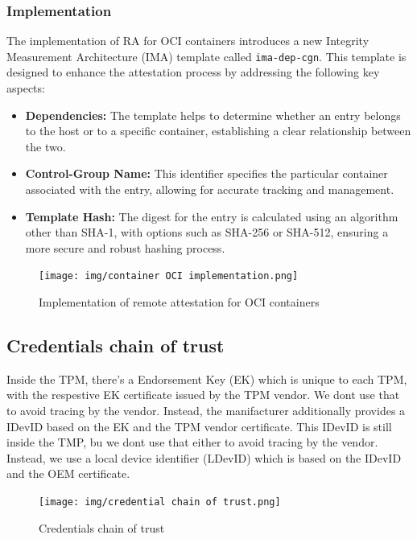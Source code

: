 \subsubsection{Implementation}

The implementation of RA for OCI containers introduces a new Integrity
Measurement Architecture (IMA) template called \texttt{ima-dep-cgn}.
This template is designed to enhance the attestation process by
addressing the following key aspects:

\begin{itemize}
    \item \textbf{Dependencies:} The template helps to determine
      whether an entry belongs to the host or to a specific container,
      establishing a clear relationship between the two.
    \item \textbf{Control-Group Name:} This identifier specifies the
      particular container associated with the entry, allowing for
      accurate tracking and management.
    \item \textbf{Template Hash:} The digest for the entry is
      calculated using an algorithm other than SHA-1, with options
      such as SHA-256 or SHA-512, ensuring a more secure and robust
      hashing process.
\end{itemize}

\begin{figure}[H]
  \centering
  \texttt{[image: img/container OCI
  implementation.png]}
  \caption{Implementation of remote attestation for OCI containers}
\end{figure}

\subsection{Credentials chain of trust}
Inside the TPM, there's a Endorsement Key (EK) which is unique to each
TPM, with the respestive EK certificate issued by the TPM vendor. We
dont use that to avoid tracing by the vendor. Instead, the
manifacturer additionally provides a IDevID based on the EK and the
TPM vendor certificate. This IDevID is still inside the TMP, bu we
dont use that either to avoid tracing by the vendor. Instead, we use
a local device identifier (LDevID) which is based on the IDevID and
the OEM certificate.

\begin{figure}[H]
  \centering
  \texttt{[image: img/credential chain of
  trust.png]}
  \caption{Credentials chain of trust}
\end{figure}

